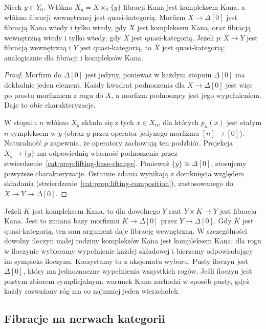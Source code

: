 \begin{stwierdzenie}\label{cat:prop:simplicial-fibration-fibers}
Niech $y\in Y_0$. Włókno $X_y=X\times_Y\{y\}$ fibracji Kana jest kompleksem Kana, a włókno fibracji wewnętrznej jest quasi-kategorią. Morfizm $X\to\Delta[0]$ jest fibracją Kana wtedy i tylko wtedy, gdy $X$ jest kompleksem Kana, oraz fibracją wewnętrzną wtedy i tylko wtedy, gdy $X$ jest quasi-kategorią. Jeżeli $p:X\to Y$ jest fibracją wewnętrzną i $Y$ jest quasi-kategorią, to $X$ jest quasi-kategorią; analogicznie dla fibracji i kompleksów Kana.
\end{stwierdzenie}
\begin{proof}
Morfizm do $\Delta[0]$ jest jedyny, ponieważ w każdym stopniu $\Delta[0]$ ma dokładnie jeden element. Każdy kwadrat podnoszenia dla $X\to\Delta[0]$ jest więc po prostu morfizmem z rogu do $X$, a morfizm podnoszący jest jego wypełnieniem. Daje to obie charakteryzacje.

W stopniu $n$ włókno $X_y$ składa się z tych $x\in X_n$, dla których $p_n(x)$ jest stałym $n$-sympleksem w $y$ (obraz $y$ przez operator jedynego morfizmu $[n]\to[0]$). Naturalność $p$ zapewnia, że operatory zachowują ten podzbiór. Projekcja $X_y\to\{y\}$ ma odpowiednią własność podnoszenia przez stwierdzenie~\ref{cat:prop:lifting-base-change}. Ponieważ $\{y\}\cong\Delta[0]$, stosujemy powyższe charakteryzacje. Ostatnie zdania wynikają z domknięcia względem składania (stwierdzenie~\ref{cat:prop:lifting-composition}), zastosowanego do $X\to Y\to\Delta[0]$.
\end{proof}

\begin{przyklad}[Rzuty]\label{cat:ex:simplicial-product-fibration}
Jeżeli $K$ jest kompleksem Kana, to dla dowolnego $Y$ rzut $Y\times K\to Y$ jest fibracją Kana. Jest to zmiana bazy morfizmu $K\to\Delta[0]$ przez $Y\to\Delta[0]$. Gdy $K$ jest quasi-kategorią, ten sam argument daje fibrację wewnętrzną. W szczególności dowolny iloczyn małej rodziny kompleksów Kana jest kompleksem Kana: dla rogu w iloczynie wybieramy wypełnienie każdej składowej i bierzemy odpowiadający im sympleks iloczynu. Korzystamy tu z aksjomatu wyboru. Pusty iloczyn jest $\Delta[0]$, który ma jednoznaczne wypełnienia wszystkich rogów. Jeśli iloczyn jest pustym zbiorem symplicjalnym, warunek Kana zachodzi w sposób pusty, gdyż każdy rozważany róg ma co najmniej jeden wierzchołek.
\end{przyklad}

\subsection{Fibracje na nerwach kategorii}

